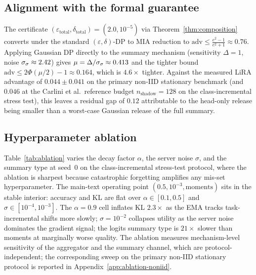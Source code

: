 \subsection{Alignment with the formal guarantee}
\label{sec:results-tightness}

The certificate $(\varepsilon_\mathrm{total}, \delta_\mathrm{total}) = (2.0,
10^{-5})$ via Theorem~\ref{thm:composition} converts under the standard
$(\varepsilon, \delta)$-DP to MIA reduction to $\mathrm{adv} \le \tfrac{e^2 - 1}{e^2
+ 1} \approx 0.76$. Applying Gaussian DP \cite{dong2019gaussian} directly to the
summary mechanism (sensitivity $\Delta{=}1$, noise $\sigma_\sigma \approx 2.42$)
gives $\mu = \Delta / \sigma_\sigma \approx 0.413$ and the tighter bound
$\mathrm{adv} \le 2\Phi(\mu/2) - 1 \approx 0.164$, which is $4.6\times$ tighter.
Against the measured LiRA advantage of $0.044 \pm 0.041$ on the primary non-IID
stationary benchmark (and $0.046$ at the Carlini et al.\ reference budget
$n_\mathrm{shadow}{=}128$ on the class-incremental stress test), this leaves a
residual gap of $0.12$ attributable to the head-only release being smaller than
a worst-case Gaussian release of the full summary.

\subsection{Hyperparameter ablation}
\label{sec:results-ablation}

Table~\ref{tab:ablation} varies the decay factor $\alpha$, the server noise
$\sigma$, and the summary type at seed~$0$ on the class-incremental stress-test
protocol, where the ablation is sharpest because catastrophic forgetting amplifies
any mis-set hyperparameter. The main-text operating point
$(0.5, 10^{-3}, \mathrm{moments})$ sits in the stable interior: accuracy and KL are
flat over $\alpha \in [0.1, 0.5]$ and $\sigma \in [10^{-4}, 10^{-3}]$. The
$\alpha{=}0.9$ cell inflates KL $2.3\times$ as the EMA tracks task-incremental
shifts more slowly; $\sigma{=}10^{-2}$ collapses utility as the server noise
dominates the gradient signal; the logits summary type is $21\times$ slower than
moments at marginally worse quality. The ablation measures mechanism-level
sensitivity of the aggregator and the summary channel, which are protocol-independent;
the corresponding sweep on the primary non-IID stationary protocol is reported in
Appendix~\ref{app:ablation-noniid}.

